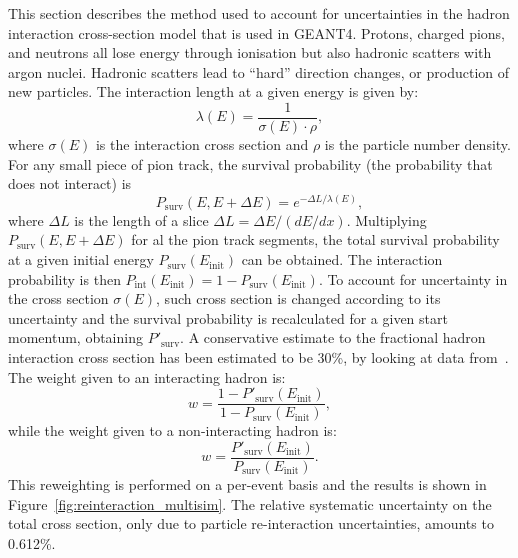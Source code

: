 This section describes the method used to account for uncertainties in the hadron interaction cross-section model that is used in GEANT4. 
Protons, charged pions, and neutrons all lose energy through ionisation but also hadronic scatters with argon nuclei. Hadronic scatters lead to ``hard'' direction changes, or production of new particles.
The interaction length at a given energy is given by:
\begin{equation}
\lambda(E) = \frac{1}{\sigma(E) \cdot \rho},
\end{equation}
where $\sigma(E)$ is the interaction cross section and $\rho$ is the particle number density. For any small piece of pion track, the survival probability (the probability that does not interact) is
\begin{equation}
P_\text{surv}(E, E + \Delta E) = e^{-\Delta L / \lambda(E)},
\end{equation}
where $\Delta L$ is the length of a slice $\Delta L = \Delta E / (dE/dx)$.
Multiplying $P_\text{surv}(E, E + \Delta E)$ for al the pion track segments, the total survival probability at a given initial energy $P_\text{surv}(E_\text{init})$ can be obtained. The interaction probability is then  $P_\text{int}(E_\text{init}) = 1 - P_\text{surv}(E_\text{init})$.
To account for uncertainty in the cross section $\sigma(E)$, such cross section is changed according to its uncertainty and the survival probability is recalculated for a given start momentum, obtaining $P'_\text{surv}$. A conservative estimate to the fractional hadron interaction cross section has been estimated to be 30\%, by looking at data from~\cite{pion_reint_1, pion_reint_2, pion_reint_3}. The weight given to an interacting hadron is:
\begin{equation}
w = \frac{1 - P'_\text{surv}(E_\text{init})}{1 - P_\text{surv}(E_\text{init})},
\end{equation}
while the weight given to a non-interacting hadron is:
\begin{equation}
w = \frac{P'_\text{surv}(E_\text{init})}{P_\text{surv}(E_\text{init})}.
\end{equation}
This reweighting is performed on a per-event basis and the results is shown in Figure~\ref{fig:reinteraction_multisim}.
The relative systematic uncertainty on the total cross section, only due to particle re-interaction uncertainties, amounts to 0.612\%.


